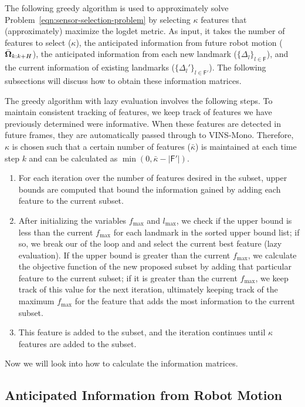 The following greedy algorithm is used to approximately solve Problem~\eqref{eqn:sensor-selection-problem} by selecting $\kappa$ features that (approximately) maximize the logdet metric.
As input, it takes the number of features to select ($\kappa$), the anticipated information from future robot motion ($\bar{\boldsymbol \Omega}_{k:k+H}$), the anticipated information from each new landmark ($\{\Delta_l\}_{l\in\mathsf{F}}$), and the current information of existing landmarks ($\{\Delta_l'\}_{l\in\mathsf{F}'}$).
The following subsections will discuss how to obtain these information matrices.

The greedy algorithm with lazy evaluation involves the following steps.
To maintain consistent tracking of features, we keep track of features we have previously determined were informative.
When these features are detected in future frames, they are automatically passed through to VINS-Mono.
Therefore, $\kappa$ is chosen such that a certain number of features ($\bar{\kappa}$) is maintained at each time step $k$ and can be calculated as $\min(0, \bar{\kappa} - |\mathsf{F}'|)$.
\begin{enumerate}
    \item For each iteration over the number of features desired in the subset, upper bounds are computed that bound the information gained by adding each feature to the current subset.
    \item After initializing the variables $f_\text{max}$ and $l_\text{max}$, we check if the upper bound is less than the current $f_\text{max}$ for each landmark in the sorted upper bound list; if so, we break our of the loop and and select the current best feature (lazy evaluation). If the upper bound is greater than the current $f_\text{max}$, we calculate the objective function of the new proposed subset by adding that particular feature to the current subset; if it is greater than the current $f_\text{max}$, we keep track of this value for the next iteration, ultimately keeping track of the maximum $f_\text{max}$ for the feature that adds the most information to the current subset.
    \item This feature is added to the subset, and the iteration continues until $\kappa$ features are added to the subset.
\end{enumerate}

Now we will look into how to calculate the information matrices.


\subsection{Anticipated Information from Robot Motion}\label{sub:info_motion}

